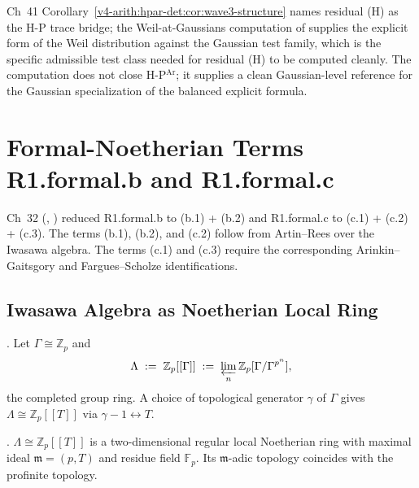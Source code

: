 \begin{remark}
\label{v4-arith:w5-i:rem:H-closure}
Ch~41 Corollary~\ref{v4-arith:hpar-det:cor:wave3-structure} names
residual (H) as the H-P trace bridge; the Weil-at-Gaussians
computation of  supplies
the explicit form of the Weil distribution against the Gaussian test
family, which is the specific admissible test class needed for
residual (H) to be computed cleanly. The computation does not close
H-P\(^{\mathrm{Ar}}\); it supplies a clean Gaussian-level
reference for the Gaussian specialization of the balanced explicit
formula.
\end{remark}

\section{Formal-Noetherian Terms R1.formal.b and R1.formal.c}
\label{v4-arith:w5-i:formal-noetherian}

Ch~32 (,
) reduced
R1.formal.b to (b.1) + (b.2) and R1.formal.c to (c.1) + (c.2) +
(c.3). The terms (b.1), (b.2), and (c.2) follow from Artin--Rees over
the Iwasawa algebra. The terms (c.1) and (c.3) require the corresponding
Arinkin--Gaitsgory and Fargues--Scholze identifications.

\subsection{Iwasawa Algebra as Noetherian Local Ring}
\label{v4-arith:w5-i:iwasawa}

\begin{definition}
\label{v4-arith:w5-i:def:iwasawa}
\ClaimStatusDefinitional. Let \(\Gamma\cong\mathbb{Z}_{p}\) and
\[
\Lambda\;:=\;\mathbb{Z}_{p}[[\Gamma]]\;:=\;\varprojlim_{n}\mathbb{Z}_{p}[\Gamma/\Gamma^{p^{n}}],
\]
the completed group ring. A choice of topological generator \(\gamma\)
of \(\Gamma\) gives \(\Lambda\cong\mathbb{Z}_{p}[[T]]\) via
\(\gamma-1\leftrightarrow T\).
\end{definition}

\begin{lemma}
\label{v4-arith:w5-i:lem:iwasawa-noeth}
\ClaimStatusProvedHere. \(\Lambda\cong\mathbb{Z}_{p}[[T]]\) is a
two-dimensional regular local Noetherian ring with maximal ideal
\(\mathfrak{m}=(p,T)\) and residue field \(\mathbb{F}_{p}\). Its
\(\mathfrak{m}\)-adic topology coincides with the profinite topology.
\end{lemma}

